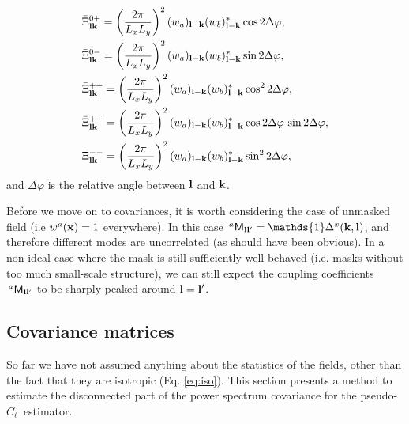 \documentclass[a4paper,11pt]{article}
\newcommand{\PCL}{pseudo-$C_\ell$~}
\begin{document}
\begin{itemize}
\begin{align}
          &\bar{\Xi}^{0+}_{{\bf l}{\bf k}}=\left(\frac{2\pi}{L_xL_y}\right)^2 (w_a)_{{\bf l}-{\bf k}}(w_b)^*_{{\bf l}-{\bf k}}\cos2\Delta\varphi,\\
          &\bar{\Xi}^{0-}_{{\bf l}{\bf k}}=\left(\frac{2\pi}{L_xL_y}\right)^2 (w_a)_{{\bf l}-{\bf k}}(w_b)^*_{{\bf l}-{\bf k}}\sin2\Delta\varphi,\\
          &\bar{\Xi}^{++}_{{\bf l}{\bf k}}=\left(\frac{2\pi}{L_xL_y}\right)^2 (w_a)_{{\bf l}-{\bf k}}(w_b)^*_{{\bf l}-{\bf k}}\cos^22\Delta\varphi,\\
          &\bar{\Xi}^{+-}_{{\bf l}{\bf k}}=\left(\frac{2\pi}{L_xL_y}\right)^2 (w_a)_{{\bf l}-{\bf k}}(w_b)^*_{{\bf l}-{\bf k}}\cos2\Delta\varphi\,\sin2\Delta\varphi,\\
          &\bar{\Xi}^{--}_{{\bf l}{\bf k}}=\left(\frac{2\pi}{L_xL_y}\right)^2 (w_a)_{{\bf l}-{\bf k}}(w_b)^*_{{\bf l}-{\bf k}}\sin^22\Delta\varphi,\\
        \end{align}
        and $\Delta\varphi$ is the relative angle between ${\bf l}$ and ${\bf k}$.
      \end{itemize}

      Before we move on to covariances, it is worth considering the case of unmasked field (i.e $w^a({\bf x})=1$ everywhere). In this case $\,^a{\sf M}_{{\bf l}{\bf l}'}=\mathds{1}\Delta^x({\bf k},{\bf l})$, and therefore different modes are uncorrelated (as should have been obvious). In a non-ideal case where the mask is still sufficiently well behaved (i.e. masks without too much small-scale structure), we can still expect the coupling coefficients $\,^a{\sf M}_{{\bf l}{\bf l}'}$ to be sharply peaked around ${\bf l}={\bf l}'$.
  
    \subsection{Covariance matrices}\label{ssec:theory.pclcov}
      So far we have not assumed anything about the statistics of the fields, other than the fact that they are isotropic (Eq. \ref{eq:iso}). This section presents a method to estimate the disconnected part of the power spectrum covariance for the \PCL estimator.
    
\end{document}
